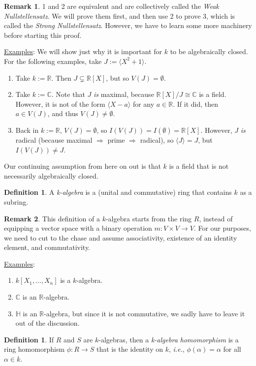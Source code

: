 \documentclass[12pt]{article}
\newcommand{\cx}{\mathbb{C}}
\newcommand{\real}{\mathbb{R}}
\newcommand{\ita}[1]{\textit{#1}}
\newcommand{\vbrack}[1]{\langle #1\rangle}
\theoremstyle{definition}
\newtheorem{definition}[theorem]{Definition}
\newtheorem*{remark}{Remark}
\begin{document}
\begin{remark}
    1 and 2 are equivalent and are collectively called the \ita{Weak Nullstellensatz}. We will prove them first, and then use 2 to prove 3, which is called the \ita{Strong Nullstellensatz}. However, we have to learn some more machinery before starting this proof.
\end{remark}
\underline{Examples}: We will show just why it is important for $k$ to be algebraically closed. For the following examples, take $J:=\vbrack{X^2+1}$.
\begin{enumerate}
    \item Take $k:=\real$. Then $J\subsetneq\real[X]$, but so $V(J)=\emptyset$.
    \item Take $k:=\cx$. Note that $J$ \ita{is} maximal, because $\real[X]/J\cong\cx$ is a field. However, it is not of the form $\vbrack{X-a}$ for any $a\in\real$. If it did, then $a\in V(J)$, and thus $V(J)\neq\emptyset$.
    \item Back in $k:=\real$, $V(J)=\emptyset$, so $I(V(J))=I(\emptyset)=\real[X]$. However, $J$ \ita{is} radical (because maximal $\Rightarrow$ prime $\Rightarrow$ radical), so $\vbrack{J}=J$, but $I(V(J))\neq J$.
\end{enumerate}
Our continuing assumption from here on out is that $k$ is a field that is not necessarily algebraically closed.
\begin{definition}
    A \ita{k-algebra} is a (unital and commutative) ring that contains $k$ as a subring.
\end{definition}
\begin{remark}
    This definition of a $k$-algebra starts from the ring $R$, instead of equipping a vector space with a binary operation $m:V\times V\to V$. For our purposes, we need to cut to the chase and assume associativity, existence of an identity element, and commutativity.
\end{remark}
\underline{Examples}:
\begin{enumerate}
    \item $k[X_1,\dotsc,X_n]$ is a $k$-algebra.
    \item $\cx$ is an $\real$-algebra.
    \item $\mathbb{H}$ is an $\real$-algebra, but since it is not commutative, we sadly have to leave it out of the discussion.
\end{enumerate}
\begin{definition}
    If $R$ and $S$ are $k$-algebras, then a \ita{k-algebra homomorphism} is a ring homomorphism $\phi:R\to S$ that is the identity on $k$, \ita{i.e.}, $\phi(\alpha)=\alpha$ for all $\alpha\in k$.
\end{definition}
\end{document}
